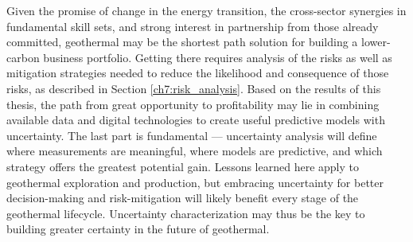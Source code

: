 Given the promise of change in the energy transition, the cross-sector synergies in fundamental skill sets, and strong interest in partnership from those already committed, geothermal may be the shortest path solution for building a lower-carbon business portfolio. Getting there requires analysis of the risks as well as mitigation strategies needed to reduce the likelihood and consequence of those risks, as described in Section \ref{ch7:risk_analysis}. Based on the results of this thesis, the path from great opportunity to profitability may lie in combining available data and digital technologies to create useful predictive models with uncertainty. The last part is fundamental --- uncertainty analysis will define where measurements are meaningful, where models are predictive, and which strategy offers the greatest potential gain. Lessons learned here apply to geothermal exploration and production, but embracing uncertainty for better decision-making and risk-mitigation will likely benefit every stage of the geothermal lifecycle. Uncertainty characterization may thus be the key to building greater certainty in the future of geothermal.